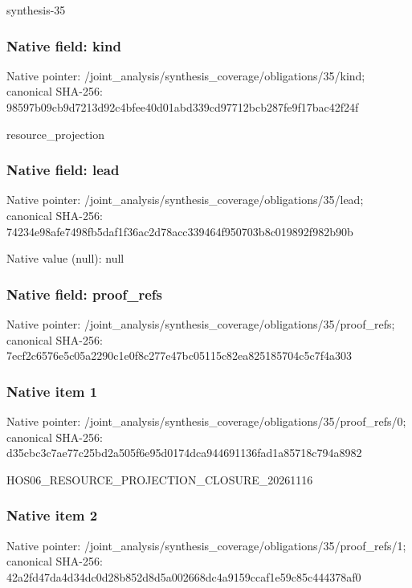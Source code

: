 \documentclass[10pt,a4paper]{article}
\begin{document}
\begingroup\raggedright\sloppy synthesis-35\par\endgroup

\subsubsection{Native field: kind}
Native pointer: /joint\_\allowbreak{}analysis/synthesis\_\allowbreak{}coverage/obligations/35/kind; canonical SHA-256: 98597b09cb9d7213d92c4bfee40d01abd339cd97712bcb287fe9f17bac42f24f

\begingroup\raggedright\sloppy resource\_\allowbreak{}projection\par\endgroup

\subsubsection{Native field: lead}
Native pointer: /joint\_\allowbreak{}analysis/synthesis\_\allowbreak{}coverage/obligations/35/lead; canonical SHA-256: 74234e98afe7498fb5daf1f36ac2d78acc339464f950703b8c019892f982b90b

Native value (null): null

\subsubsection{Native field: proof\_\allowbreak{}refs}
Native pointer: /joint\_\allowbreak{}analysis/synthesis\_\allowbreak{}coverage/obligations/35/proof\_\allowbreak{}refs; canonical SHA-256: 7ecf2c6576e5c05a2290c1e0f8c277e47bc05115c82ea825185704c5c7f4a303

\subsubsection{Native item 1}
Native pointer: /joint\_\allowbreak{}analysis/synthesis\_\allowbreak{}coverage/obligations/35/proof\_\allowbreak{}refs/0; canonical SHA-256: d35cbc3c7ae77c25bd2a505f6e95d0174dca944691136fad1a85718c794a8982

\begingroup\raggedright\sloppy HOS06\_\allowbreak{}RESOURCE\_\allowbreak{}PROJECTION\_\allowbreak{}CLOSURE\_\allowbreak{}20261116\par\endgroup

\subsubsection{Native item 2}
Native pointer: /joint\_\allowbreak{}analysis/synthesis\_\allowbreak{}coverage/obligations/35/proof\_\allowbreak{}refs/1; canonical SHA-256: 42a2fd47da4d34dc0d28b852d8d5a002668dc4a9159ccaf1e59c85c444378af0
\end{document}
